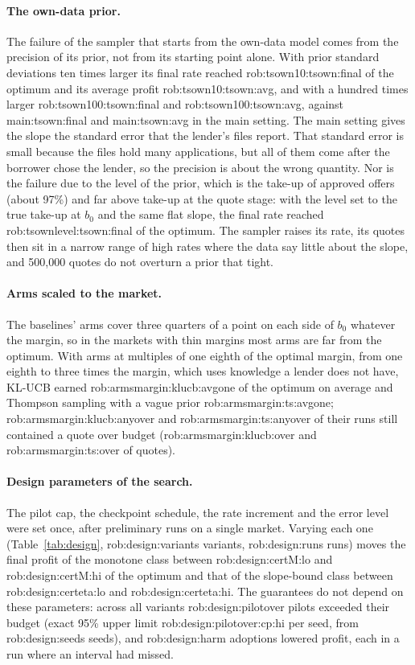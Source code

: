 \paragraph{The own-data prior.} The failure of the sampler that starts from the own-data model comes from the
precision of its prior, not from its starting point alone. With prior standard deviations ten times larger its
final rate reached \num{rob:tsown10:tsown:final} of the optimum and its average profit
\num{rob:tsown10:tsown:avg}, and with a hundred times larger \num{rob:tsown100:tsown:final} and
\num{rob:tsown100:tsown:avg}, against \num{main:tsown:final} and \num{main:tsown:avg} in the main setting. The main
setting gives the slope the standard error that the lender's files report. That standard error is small because the
files hold many applications, but all of them come after the borrower chose the lender, so the precision is about
the wrong quantity. Nor is the failure due to the level of the prior, which is the take-up of approved offers
(about 97\%) and far above take-up at the quote stage: with the level set to the true take-up at $b_0$ and the
same flat slope, the final rate reached \num{rob:tsownlevel:tsown:final} of the optimum. The sampler raises its
rate, its quotes then sit in a narrow range of high rates where the data say little about the slope, and
500{,}000 quotes do not overturn a prior that tight.

\paragraph{Arms scaled to the market.} The baselines' arms cover three quarters of a point on each side of $b_0$
whatever the margin, so in the markets with thin margins most arms are far from the optimum. With arms at
multiples of one eighth of the optimal margin, from one eighth to three times the margin, which uses knowledge a
lender does not have, KL-UCB earned \num{rob:armsmargin:klucb:avgone} of the optimum on average and Thompson
sampling with a vague prior \num{rob:armsmargin:ts:avgone}; \num{rob:armsmargin:klucb:anyover} and
\num{rob:armsmargin:ts:anyover} of their runs still contained a quote over budget
(\num{rob:armsmargin:klucb:over} and \num{rob:armsmargin:ts:over} of quotes).

\paragraph{Design parameters of the search.} The pilot cap, the checkpoint schedule, the rate increment and the
error level were set once, after preliminary runs on a single market. Varying each one
(Table~\ref{tab:design}, \num{rob:design:variants} variants, \num{rob:design:runs} runs) moves the final profit
of the monotone class between \num{rob:design:certM:lo} and \num{rob:design:certM:hi} of the optimum and that of
the slope-bound class between \num{rob:design:certeta:lo} and \num{rob:design:certeta:hi}. The guarantees do not
depend on these parameters: across all variants \num{rob:design:pilotover} pilots exceeded their budget (exact 95\%
upper limit \num{rob:design:pilotover:cp:hi} per seed, from \num{rob:design:seeds} seeds), and
\num{rob:design:harm} adoptions lowered profit, each in a run where an interval had missed.
